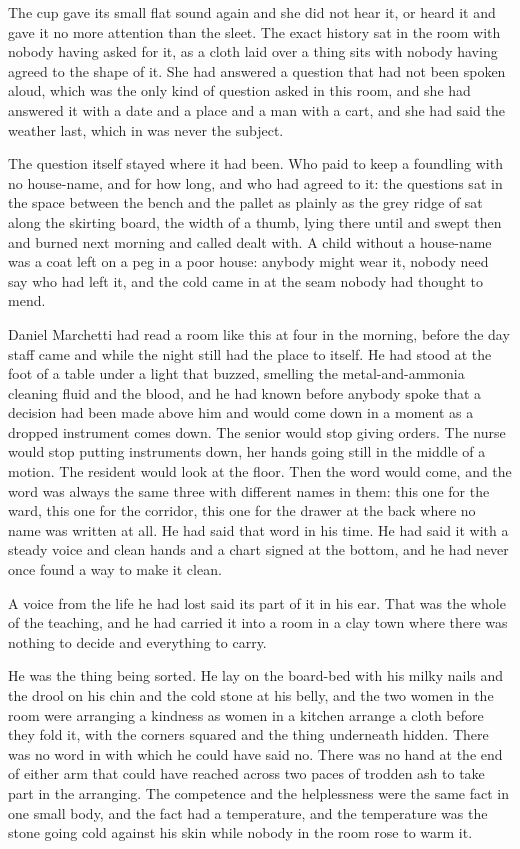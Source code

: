 The cup gave its small flat sound again and she did not hear it, or heard it and gave it no more attention than the sleet. The exact history sat in the room with nobody having asked for it, as a cloth laid over a thing sits with nobody having agreed to the shape of it. She had answered a question that had not been spoken aloud, which was the only kind of question asked in this room, and she had answered it with a date and a place and a man with a cart, and she had said the weather last, which in  was never the subject.

The question itself stayed where it had been. Who paid to keep a foundling with no house-name, and for how long, and who had agreed to it: the questions sat in the space between the bench and the pallet as plainly as the grey ridge of  sat along the skirting board, the width of a thumb, lying there until  and swept then and burned next morning and called dealt with. A child without a house-name was a coat left on a peg in a poor house: anybody might wear it, nobody need say who had left it, and the cold came in at the seam nobody had thought to mend.

Daniel Marchetti had read a room like this at four in the morning, before the day staff came and while the night still had the place to itself. He had stood at the foot of a table under a light that buzzed, smelling the metal-and-ammonia cleaning fluid and the blood, and he had known before anybody spoke that a decision had been made above him and would come down in a moment as a dropped instrument comes down. The senior would stop giving orders. The nurse would stop putting instruments down, her hands going still in the middle of a motion. The resident would look at the floor. Then the word would come, and the word was always the same three with different names in them: this one for the ward, this one for the corridor, this one for the drawer at the back where no name was written at all. He had said that word in his time. He had said it with a steady voice and clean hands and a chart signed at the bottom, and he had never once found a way to make it clean.

A voice from the life he had lost said its part of it in his ear.  That was the whole of the teaching, and he had carried it into a room in a clay town where there was nothing to decide and everything to carry.

He was the thing being sorted. He lay on the board-bed with his milky nails and the drool on his chin and the cold stone at his belly, and the two women in the room were arranging a kindness as women in a kitchen arrange a cloth before they fold it, with the corners squared and the thing underneath hidden. There was no word in  with which he could have said no. There was no hand at the end of either arm that could have reached across two paces of trodden ash to take part in the arranging. The competence and the helplessness were the same fact in one small body, and the fact had a temperature, and the temperature was the stone going cold against his skin while nobody in the room rose to warm it.

